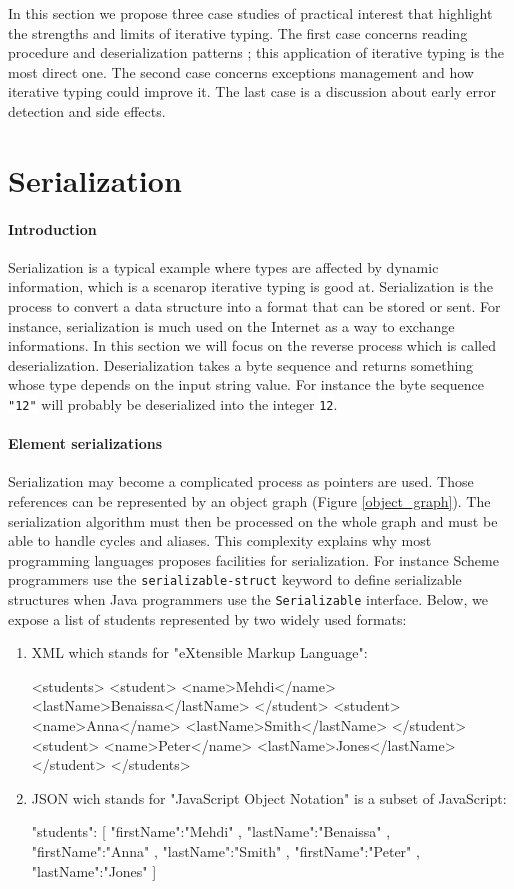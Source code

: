 \documentclass[a4paper]{report}
\newcommand{\ischeme}[1]{\colorbox{white}{\lstinline[language=scheme]&#1&}} %
\newcommand{\icode}[1]{\colorbox{white}{\lstinline[language=code]&#1&}} %
\newcommand{\ijava}[1]{\colorbox{white}{\lstinline[language=code]&#1&}} %
\newcommand{\reffig}[1]{(Figure \ref{#1})}
\begin{document}
In this section we propose three case studies of practical interest that highlight the strengths and limits of iterative typing. The first case concerns reading procedure and deserialization patterns ; this application of iterative typing is the most direct one. The second case concerns exceptions management and how iterative typing could improve it. The last case is a discussion about early error detection and side effects.

\section{Serialization\label{sec_deser}}

\paragraph{Introduction} Serialization is a typical example where types are affected by dynamic information, which is a scenarop iterative typing is good at. Serialization is the process to convert a data structure into a format that can be stored or sent. For instance, serialization is much used on the Internet as a way to exchange informations. In this section we will focus on the reverse process which is called deserialization. Deserialization takes a byte sequence and returns something whose type depends on the input string value. For instance the byte sequence \icode{"12"} will probably be deserialized into the integer \icode{12}.

\paragraph{Element serializations} Serialization may become a complicated process as pointers are used. Those references can be represented by an object graph \reffig{object_graph}. The serialization algorithm must then be processed on the whole graph and must be able to handle cycles and aliases. This complexity explains why most programming languages proposes facilities for serialization. For instance Scheme programmers use the \ischeme{serializable-struct} keyword to define serializable structures when Java programmers use the \ijava{Serializable} interface. Below, we expose a list of students represented by two widely used formats:
\begin{enumerate}
\item XML which stands for "eXtensible Markup Language":
\begin{code}
<students>
	<student>
		<name>Mehdi</name>
		<lastName>Benaissa</lastName>
	</student>
	<student>
		<name>Anna</name>
		<lastName>Smith</lastName>
	</student>
	<student>
		<name>Peter</name>
		<lastName>Jones</lastName>
	</student>
</students>
\end{code}
\item JSON wich stands for "JavaScript Object Notation" is a subset of JavaScript:
\begin{code}
{
"students": [
{ "firstName":"Mehdi" , "lastName":"Benaissa" }, 
{ "firstName":"Anna" , "lastName":"Smith" }, 
{ "firstName":"Peter" , "lastName":"Jones" }
]
}
\end{code} 
\end{enumerate}
\end{document}
